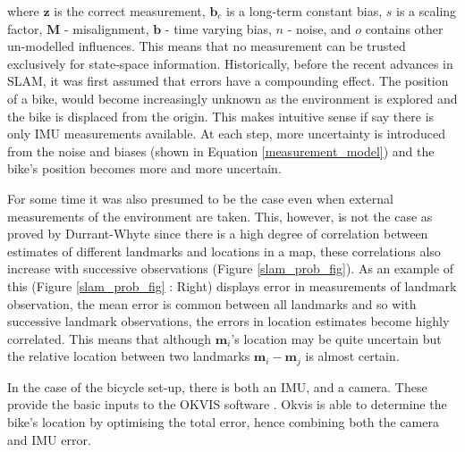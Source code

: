 \documentclass[a4paper,11pt,notitlepage]{article}
\begin{document}
where $\textbf{z}$ is the correct measurement, $\textbf{b}_{c}$ is a long-term constant bias, $s$ is a scaling factor, $\textbf{M}$ - misalignment, $\textbf{b}$ - time varying bias, $n$ - noise, and $o$ contains other un-modelled influences. This means that no measurement can be trusted exclusively for state-space information. \newline\newline
Historically, before the recent advances in SLAM, it was first assumed that errors have a compounding effect. The position of a bike, would become increasingly unknown as the environment is explored and the bike is displaced from the origin. This makes intuitive sense if say there is only IMU measurements available. At each step, more uncertainty is introduced from the noise and biases (shown in Equation \ref{measurement_model}) and the bike's position becomes more and more uncertain.

For some time it was also presumed to be the case even when external measurements of the environment are taken. This, however, is not the case as proved by Durrant-Whyte \cite{F_Durr_1} since there is a high degree of correlation between estimates of different landmarks and locations in a map, these correlations also increase with successive observations (Figure \ref{slam_prob_fig}). As an example of this (Figure \ref{slam_prob_fig} : Right) displays error in measurements of landmark observation, the mean error is common between all landmarks and so with successive landmark observations, the errors in location estimates become highly correlated. This means that although $\textbf{m}_{i}$'s location may be quite uncertain but the relative location between two landmarks $\textbf{m}_{i}-\textbf{m}_{j}$ is almost certain.\newline\newline 

In the case of the bicycle set-up, there is both an IMU, and a camera. These provide the basic inputs to the OKVIS software \cite{Okvis_1}. Okvis is able to determine the bike's location by optimising the total error, hence combining both the camera and IMU error.
\end{document}
